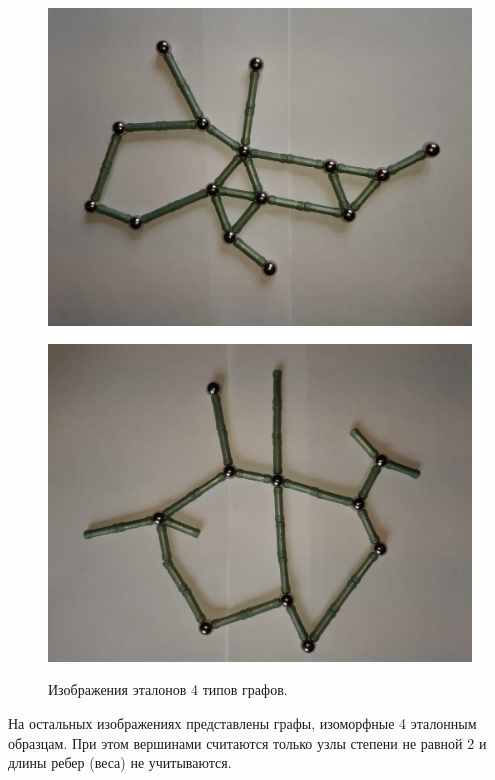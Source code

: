 \documentclass[10pt]{article}
\begin{document}
\begin{figure}[h]
\begin{minipage}[h]{0.45\linewidth}
			\begin{center}
				{\includegraphics[width=1.0\linewidth]{data/4.pdf}}
			\end{center}
		\end{minipage}
		\hfill
		\begin{minipage}[h]{0.45\linewidth}
			\begin{center}
				{\includegraphics[width=1.0\linewidth]{data/5.pdf}}
			\end{center}
		\end{minipage}
		\caption{Изображения эталонов 4 типов графов.}
		\label{ris:image1}
	\end{figure}

	На остальных изображениях представлены графы, изоморфные 4 эталонным образцам. При этом вершинами считаются только узлы степени не равной 2 и длины ребер (веса) не учитываются.
	
\end{document}
